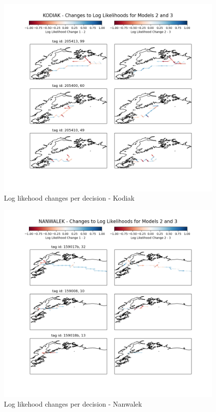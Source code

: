 \documentclass[11pt]{article}
\begin{document}
\begin{figure}[h!] 
	\centering
  \includegraphics[width=140mm]{figures/kodiak_map.png}
  \caption{Log likehood changes per decision - Kodiak}
  \label{fig:kodiak_map}
\end{figure}

\begin{figure}[h!] 
	\centering
  \includegraphics[width=140mm]{figures/nanwalek_map.png}
  \caption{Log likehood changes per decision - Nanwalek}
  \label{fig:nanwalek_map}
\end{figure}
\end{document}
